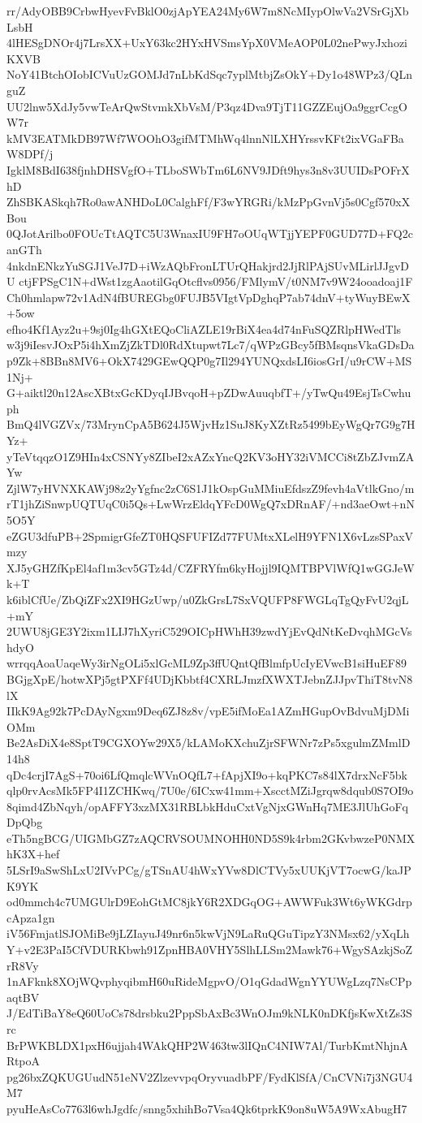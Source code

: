 rr/AdyOBB9CrbwHyevFvBklO0zjApYEA24My6W7m8NcMIypOlwVa2VSrGjXbLsbH
4lHESgDNOr4j7LrsXX+UxY63kc2HYxHVSmsYpX0VMeAOP0L02nePwyJxhoziKXVB
NoY41BtchOIobICVuUzGOMJd7nLbKdSqc7yplMtbjZsOkY+Dy1o48WPz3/QLnguZ
UU2lnw5XdJy5vwTeArQwStvmkXbVsM/P3qz4Dva9TjT11GZZEujOa9ggrCcgOW7r
kMV3EATMkDB97Wf7WOOhO3gifMTMhWq4lnnNlLXHYrssvKFt2ixVGaFBaW8DPf/j
IgklM8BdI638fjnhDHSVgfO+TLboSWbTm6L6NV9JDft9hys3n8v3UUIDsPOFrXhD
ZhSBKASkqh7Ro0awANHDoL0CalghFf/F3wYRGRi/kMzPpGvnVj5s0Cgf570xXBou
0QJotArilbo0FOUcTtAQTC5U3WnaxIU9FH7oOUqWTjjYEPF0GUD77D+FQ2canGTh
4nkdnENkzYuSGJ1VeJ7D+iWzAQbFronLTUrQHakjrd2JjRlPAjSUvMLirlJJgvDU
ctjFPSgC1N+dWst1zgAaotilGqOtcflvs0956/FMlymV/t0NM7v9W24ooadoaj1F
Ch0hmlapw72v1AdN4fBUREGbg0FUJB5VIgtVpDghqP7ab74dnV+tyWuyBEwX+5ow
efho4Kf1Ayz2u+9sj0Ig4hGXtEQoCliAZLE19rBiX4ea4d74nFuSQZRlpHWedTls
w3j9iIesvJOxP5i4hXmZjZkTDl0RdXtupwt7Lc7/qWPzGBcy5fBMsqnsVkaGDsDa
p9Zk+8BBn8MV6+OkX7429GEwQQP0g7Il294YUNQxdsLI6iosGrI/u9rCW+MS1Nj+
G+aiktl20n12AscXBtxGcKDyqIJBvqoH+pZDwAuuqbfT+/yTwQu49EsjTsCwhuph
BmQ4lVGZVx/73MrynCpA5B624J5WjvHz1SuJ8KyXZtRz5499bEyWgQr7G9g7HYz+
yTeVtqqzO1Z9HIn4xCSNYy8ZIbeI2xAZxYncQ2KV3oHY32iVMCCi8tZbZJvmZAYw
ZjlW7yHVNXKAWj98z2yYgfnc2zC6S1J1kOspGuMMiuEfdszZ9fevh4aVtlkGno/m
rT1jhZiSnwpUQTUqC0i5Qs+LwWrzEldqYFcD0WgQ7xDRnAF/+nd3aeOwt+nN5O5Y
eZGU3dfuPB+2SpmigrGfeZT0HQSFUFIZd77FUMtxXLelH9YFN1X6vLzsSPaxVmzy
XJ5yGHZfKpEl4af1m3cv5GTz4d/CZFRYfm6kyHojjl9IQMTBPVlWfQ1wGGJeWk+T
k6iblCfUe/ZbQiZFx2XI9HGzUwp/u0ZkGrsL7SxVQUFP8FWGLqTgQyFvU2qjL+mY
2UWU8jGE3Y2ixm1LIJ7hXyriC529OICpHWhH39zwdYjEvQdNtKeDvqhMGcVshdyO
wrrqqAoaUaqeWy3irNgOLi5xlGcML9Zp3ffUQntQfBlmfpUcIyEVwcB1siHuEF89
BGjgXpE/hotwXPj5gtPXFf4UDjKbbtf4CXRLJmzfXWXTJebnZJJpvThiT8tvN8lX
IIkK9Ag92k7PcDAyNgxm9Deq6ZJ8z8v/vpE5ifMoEa1AZmHGupOvBdvuMjDMiOMm
Be2AsDiX4e8SptT9CGXOYw29X5/kLAMoKXchuZjrSFWNr7zPs5xgulmZMmlD14h8
qDc4crjI7AgS+70oi6LfQmqlcWVnOQfL7+fApjXI9o+kqPKC7s84lX7drxNcF5bk
qlp0rvAcsMk5FP4I1ZCHKwq/7U0e/6ICxw41mm+XscctMZiJgrqw8dqub0S7OI9o
8qimd4ZbNqyh/opAFFY3xzMX31RBLbkHduCxtVgNjxGWnHq7ME3JlUhGoFqDpQbg
eTh5ngBCG/UIGMbGZ7zAQCRVSOUMNOHH0ND5S9k4rbm2GKvbwzeP0NMXhK3X+hef
5LSrI9aSwShLxU2IVvPCg/gTSnAU4hWxYVw8DlCTVy5xUUKjVT7ocwG/kaJPK9YK
od0mmch4c7UMGUlrD9EohGtMC8jkY6R2XDGqOG+AWWFuk3Wt6yWKGdrpcApza1gn
iV56FmjatlSJOMiBe9jLZIayuJ49nr6n5kwVjN9LaRuQGuTipzY3NMsx62/yXqLh
Y+v2E3PaI5CfVDURKbwh91ZpnHBA0VHY5SlhLLSm2Mawk76+WgySAzkjSoZrR8Vy
1nAFknk8XOjWQvphyqibmH60uRideMgpvO/O1qGdadWgnYYUWgLzq7NsCPpaqtBV
J/EdTiBaY8eQ60UoCs78drsbku2PppSbAxBc3WnOJm9kNLK0nDKfjsKwXtZs3Src
BrPWKBLDX1pxH6ujjah4WAkQHP2W463tw3lIQnC4NIW7Al/TurbKmtNhjnARtpoA
pg26bxZQKUGUudN51eNV2ZlzevvpqOryvuadbPF/FydKlSfA/CnCVNi7j3NGU4M7
pyuHeAsCo7763l6whJgdfc/snng5xhihBo7Vsa4Qk6tprkK9on8uW5A9WxAbugH7
